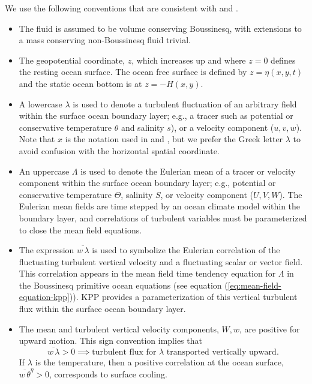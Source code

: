 We use the following conventions that are consistent with
\cite{LargeKPP} and \cite{LargeKPP_lectures}.

\begin{itemize}
 
\item The fluid is assumed to be volume conserving Boussinesq, with
  extensions to a mass conserving non-Boussinesq fluid trivial.

\item \label{geopotential_defined} The geopotential coordinate, $z$,
  which increases up and where $z=0$ defines the resting ocean
  surface. The ocean free surface is defined by $z=\eta(x,y,t)$ and
  the static ocean bottom is at $z=-H(x,y)$.

\item \label{lambda_defined} A lowercase $\lambda$ is used to denote
  a turbulent fluctuation of an arbitrary field within the surface
  ocean boundary layer; e.g., a tracer such as potential or
  conservative temperature $\theta$ and salinity $s$), or a velocity
  component ($u,v,w$). Note that $x$ is the notation used in
  \cite{LargeKPP} and \cite{LargeKPP_lectures}, but we prefer the
  Greek letter $\lambda$ to avoid confusion with the horizontal
  spatial coordinate.

\item \label{Lambda_defined} An uppercase $\Lambda$ is used to denote
  the Eulerian mean of a tracer or velocity component within the
  surface ocean boundary layer; e.g., potential or conservative
  temperature $\Theta$, salinity $S$, or velocity component ($U,V,W$).
  The Eulerian mean fields are time stepped by an ocean climate model
  within the boundary layer, and correlations of turbulent variables
  must be parameterized to close the mean field equations.

\item \label{correlation_defined} The expression $\overline{w \,
    \lambda}$ is used to symbolize the Eulerian correlation of the
  fluctuating turbulent vertical velocity and a fluctuating scalar or
  vector field. This correlation appears in the mean field time
  tendency equation for $\Lambda$ in the Boussinesq primitive ocean
  equations (see equation (\ref{eq:mean-field-equation-kpp})). KPP
  provides a parameterization of this vertical turbulent flux within
  the surface ocean boundary layer.

\item \label{w_W_defined} The mean and turbulent vertical velocity
  components, $W,w$, are positive for upward motion. This sign
  convention implies that
   \begin{equation}
  \overline{w \, \lambda}   > 0  \implies \mbox{turbulent flux for $\lambda$ transported vertically upward}.
\label{eq:correlation-convention}
\end{equation}
If $\lambda$ is the temperature, then a positive correlation at the
ocean surface, $\overline{w \, \theta}^{\eta} > 0$, corresponds to
surface cooling.

\end{itemize}


